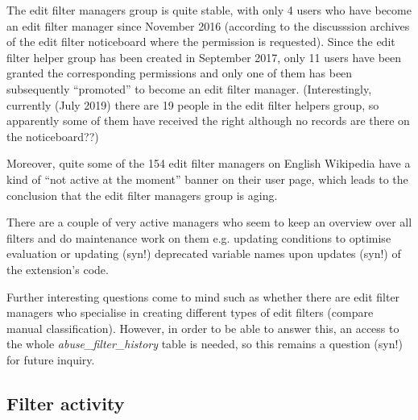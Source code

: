 The edit filter managers group is quite stable, with only 4 users who have become an edit filter manager since November 2016 (according to the discusssion archives of the edit filter noticeboard where the permission is requested).
Since the edit filter helper group has been created in September 2017, only 11 users have been granted the corresponding permissions and only one of them has been subsequently ``promoted'' to become an edit filter manager.
(Interestingly, currently (July 2019) there are 19 people in the edit filter helpers group, so apparently some of them have received the right although no records are there on the noticeboard??)

Moreover, quite some of the 154 edit filter managers on English Wikipedia have a kind of ``not active at the moment'' banner on their user page, which leads to the conclusion that the edit filter managers group is aging.


There are a couple of very active managers who seem to keep an overview over all filters and do maintenance work on them e.g. updating conditions to optimise evaluation or updating (syn!) deprecated variable names upon updates (syn!) of the extension's code.

Further interesting questions come to mind such as whether there are edit filter managers who specialise in creating different types of edit filters (compare manual classification).
However, in order to be able to answer this, an access to the whole \emph{abuse\_filter\_history} table is needed, so this remains a question (syn!) for future inquiry.



\subsection{Filter activity}

